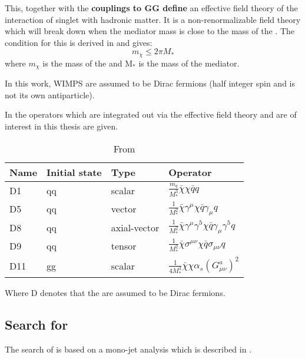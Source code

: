 This, together with the \textbf{couplings to GG define} an effective field theory of the interaction of singlet \abbrWIMPS with hadronic matter. It is a non-renormalizable field theory which will break down when the mediator mass is close to the mass of the \abbrWIMP .
The condition for this is derived in \citep{82.116010} and gives:
\begin{equation}
m_\chi \leqslant 2\pi M_*
\end{equation}
where $m_\chi$ is the mass of the \abbrWIMP and M$_*$ is the mass of the mediator. 

In this work, WIMPS are assumed to be Dirac fermions (half integer spin and is not its own antiparticle). 
 
In  the operators which are integrated out via the effective field theory and are of interest in this thesis are given.
\renewcommand{\arraystretch}{1.5} %
\begin{table}[H]
\begin{center}
    \begin{tabular}{ | l | l | l | l |}
    \hline
    Name & Initial state & Type & Operator \\ \hline
  	D1 & qq & scalar & $\frac{m_q}{M^3_*} \bar{\chi} \chi \bar{q} q$ \\ \hline
  	D5 & qq & vector & $\frac{1}{M^2_*} \bar{\chi} \gamma^\mu \chi \bar{q} \gamma_\mu q$ \\ \hline
  	D8 & qq & axial-vector & $\frac{1}{M^2_*}\bar{\chi}\gamma^\mu \gamma^5 \chi \bar{q} \gamma_\mu \gamma^5 q $ \\ \hline
  	D9 & qq & tensor & $\frac{1}{M^2_*} \bar{\chi}\sigma^{\mu \nu} \chi \bar{q} \sigma_{\mu \nu} q  $\\ \hline
  	D11 & gg & scalar & $\frac{1}{4M^3_*}\bar{\chi}\chi \alpha_s (G^a_{\mu \nu})^2 $\\ \hline
  	\end{tabular}

  	\caption{From \citep{CERN-PH-EP-2012-210}}
  	\label{tab:operators}
  	  	\end{center}
    \end{table}
\renewcommand{\arraystretch}{1.0}  %
Where D denotes that the \abbrWIMPS are assumed to be Dirac fermions.

\subsection{Search for \abbrWIMPS}
The search of \abbrWIMPS is based on a mono-jet analysis which is described in . 


